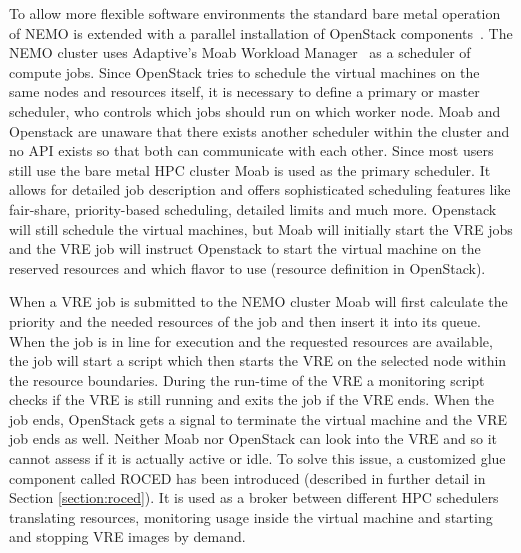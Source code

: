 To allow more flexible software environments the standard bare metal
operation of NEMO is extended with a parallel installation of OpenStack
components~\cite{hpc-symp:2016}.
The NEMO cluster uses Adaptive's Moab Workload Manager~\cite{Moab} as a
scheduler of compute jobs.
Since OpenStack tries to schedule the virtual machines on the same nodes and
resources itself, it is necessary to define a primary or master scheduler, who
controls which jobs should run on which worker node. Moab and Openstack are
unaware that there exists another scheduler within the cluster and no API exists
so that both can communicate with each other. Since most users still use the
bare metal HPC cluster Moab is used as the primary scheduler. It allows for
detailed job description and offers sophisticated scheduling features like
fair-share, priority-based scheduling, detailed limits and much more. Openstack
will still schedule the virtual machines, but Moab will initially start the VRE
jobs and the VRE job will instruct Openstack to start the virtual machine on the
reserved resources and which flavor to use (resource definition in OpenStack).

When a VRE job is submitted to the NEMO cluster Moab will first calculate the
priority and the needed resources of the job and then insert it into its queue.
When the job is in line for execution and the requested resources are available,
the job will start a script which then starts the VRE on the selected node
within the resource boundaries. During the run-time of the VRE a monitoring
script checks if the VRE is still running and exits the job if the VRE ends.
When the job ends, OpenStack gets a signal to terminate the virtual machine and
the VRE job ends as well.  Neither Moab nor OpenStack can look into the VRE and
so it cannot assess if it is actually active or idle. To solve this issue, a
customized glue component called ROCED has been introduced (described in
further detail in Section \ref{section:roced}).  It is used as a broker between
different HPC schedulers translating resources, monitoring usage inside the
virtual machine and starting and stopping VRE images by demand.
